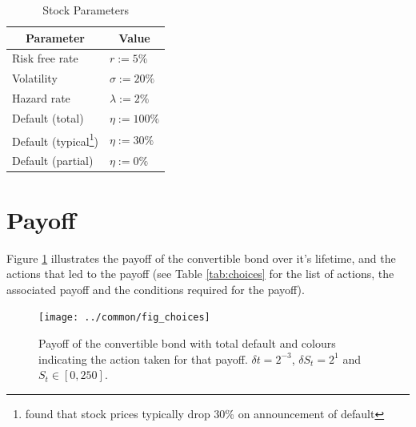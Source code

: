 \documentclass[a4paper,11pt,oneside]{report}
\theoremstyle{plain}
\theoremstyle{definition}
\def\h{\\\hline}
\newcommand{\theader}[1]{\multicolumn{1}{|c|}{\textbf{#1}}}
\def\S{\ensuremath{S_t}\xspace}
\def\DS{\ensuremath{\delta S_t}\xspace}
\def\Dt{\ensuremath{\delta t}\xspace}
\begin{document}
\begin{savenotes}
\begin{table}[ht]
 \centering
 \begin{tabular}{|l|l|} \hline
  \theader{Parameter} & \theader{Value} \h
  Risk free rate      & $r := 5\%$ \h
  Volatility          & $\sigma := 20\%$ \h
  Hazard rate         & $\lambda := 2\%$ \h
  Default (total)     & $\eta := 100\%$ \h
  Default (typical\footnote{\citet{BP95} found that stock prices typically drop 30\% on announcement of default}) & $\eta := 30\%$ \h
  Default (partial)   & $\eta := 0\%$ \h
 \end{tabular}
 \caption{Stock Parameters}
 \label{tab:stock_parameters}
\end{table}
\end{savenotes}


\section{Payoff}
Figure \ref{fig:choices} illustrates the payoff of the convertible bond over it's lifetime, and the actions that led to the payoff (see Table \ref{tab:choices} for the list of actions, the associated payoff and the conditions required for the payoff).

\begin{figure}[ht]
 \centering
 \texttt{[image: ../common/fig\_choices]}
 \caption[Payoff]{Payoff of the convertible bond with total default and colours indicating the action taken for that payoff.  $\Dt = 2^{-3}$, $\DS = 2^{1}$ and $\S \in [0, 250]$.}
 \label{fig:choices}
\end{figure}
\end{document}
